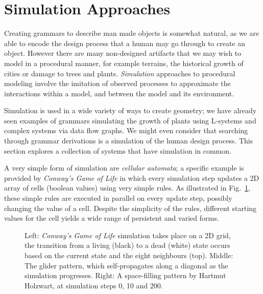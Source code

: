 \section{Simulation Approaches} %
\label{s:simulation}

Creating grammars to describe man made objects is somewhat natural, as we are able to encode the design process that a human may go through to create an object. However there are many non-designed artifacts that we may wish to model in a procedural manner, for example terrains, the historical growth of cities or damage to trees and plants. \emph{Simulation} approaches to procedural modeling involve the imitation of observed processes to approximate the interactions within a model, and between the model and its environment.

Simulation is used in a wide variety of ways to create geometry; we have already seen examples of grammars simulating the growth of plants using L-systems\cite{Reffye88} and complex systems via data flow graphs\cite{labview}. We might even consider that searching through grammar derivations is a simulation of the human design process. This section explores a collection of systems that have simulation in common.

A very simple form of simulation are \emph{cellular automata}; a specific example is provided by \emph{Conway's Game of Life}\cite{ConwaysLife} in which every simulation step updates a 2D array of cells (boolean values) using very simple rules. As illustrated in Fig.~\ref{fig:cgol}, these simple rules are executed in parallel on every update step, possibly changing the value of a cell. Despite the simplicity of the rules, different starting values for the cell yields a wide range of persistent and varied forms.

\begin{figure}
\centering
\def\svgwidth{1.\columnwidth}

\caption[Conway's game of Life]{\label{fig:cgol}Left: \emph{Conway's Game of Life}\cite{ConwaysLife} simulation takes place on a 2D grid, the transition from a living (black) to a dead (white) state occurs based on the current state and the eight neighbours (top). Middle: The glider pattern, which self-propagates along a diagonal as the simulation progresses. Right: A space-filling pattern by Hartmut Holzwart, at simulation steps 0, 10 and 200.}
\end{figure}

